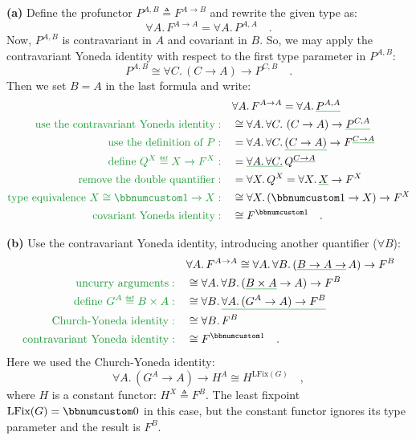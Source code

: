 \textbf{(a)} Define the profunctor $P^{A,B}\triangleq F^{A\rightarrow B}$
and rewrite the given type as:
\[
\forall A.\,F^{A\rightarrow A}=\forall A.\,P^{A,A}\quad.
\]
Now, $P^{A,B}$ is contravariant in $A$ and covariant in $B$. So,
we may apply the contravariant Yoneda identity with respect to the
first type parameter in $P^{A,B}$:
\[
P^{A,B}\cong\forall C.\,(C\rightarrow A)\rightarrow P^{C,B}\quad.
\]
Then we set $B=A$ in the last formula and write:
\begin{align*}
 & \forall A.\,F^{A\rightarrow A}=\forall A.\,\gunderline{P^{A,A}}\\
{\color{greenunder}\text{use the contravariant Yoneda identity}:}\quad & \cong\forall A.\,\forall C.\,\left(C\rightarrow A\right)\rightarrow\gunderline{P^{C,A}}\\
{\color{greenunder}\text{use the definition of }P:}\quad & =\forall A.\,\forall C.\,\gunderline{\left(C\rightarrow A\right)}\rightarrow F^{\gunderline{C\rightarrow A}}\\
{\color{greenunder}\text{define }Q^{X}\triangleq X\rightarrow F^{X}:}\quad & =\gunderline{\forall A.\,\forall C.}\,Q^{\gunderline{C\rightarrow A}}\\
{\color{greenunder}\text{remove the double quantifier}:}\quad & =\forall X.\,Q^{X}=\forall X.\,\gunderline X\rightarrow F^{X}\\
{\color{greenunder}\text{type equivalence }X\cong\bbnum 1\rightarrow X:}\quad & \cong\forall X.\,(\bbnum 1\rightarrow X)\rightarrow F^{X}\\
{\color{greenunder}\text{covariant Yoneda identity}:}\quad & \cong F^{\bbnum 1}\quad.
\end{align*}

\textbf{(b)} Use the contravariant Yoneda identity, introducing another
quantifier ($\forall B$):
\begin{align*}
 & \forall A.\,F^{A\rightarrow A}\cong\forall A.\,\forall B.\,(\gunderline{B\rightarrow A\rightarrow}\,A)\rightarrow F^{B}\\
{\color{greenunder}\text{uncurry arguments}:}\quad & \cong\forall A.\,\forall B.\,(\gunderline{B\times A}\rightarrow A)\rightarrow F^{B}\\
{\color{greenunder}\text{define }G^{A}\triangleq B\times A:}\quad & \cong\forall B.\,\gunderline{\forall A.\,(G^{A}\rightarrow A)\rightarrow F^{B}}\\
{\color{greenunder}\text{Church-Yoneda identity}:}\quad & \cong\forall B.\,F^{B}\\
{\color{greenunder}\text{contravariant Yoneda identity}:}\quad & \cong F^{\bbnum 1}\quad.
\end{align*}
Here we used the Church-Yoneda identity:
\[
\forall A.\,(G^{A}\rightarrow A)\rightarrow H^{A}\cong H^{\text{LFix}(G)}\quad,
\]
where $H$ is a constant functor: $H^{X}\triangleq F^{B}$. The least
fixpoint $\text{LFix}(G)=\bbnum 0$ in this case, but the constant
functor ignores its type parameter and the result is $F^{B}$.

